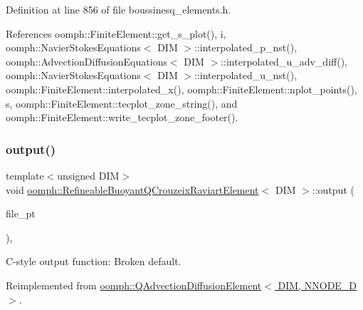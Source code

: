 Definition at line 856 of file boussinesq\+\_\+elements.\+h.



References oomph\+::\+Finite\+Element\+::get\+\_\+s\+\_\+plot(), i, oomph\+::\+Navier\+Stokes\+Equations$<$ D\+I\+M $>$\+::interpolated\+\_\+p\+\_\+nst(), oomph\+::\+Advection\+Diffusion\+Equations$<$ D\+I\+M $>$\+::interpolated\+\_\+u\+\_\+adv\+\_\+diff(), oomph\+::\+Navier\+Stokes\+Equations$<$ D\+I\+M $>$\+::interpolated\+\_\+u\+\_\+nst(), oomph\+::\+Finite\+Element\+::interpolated\+\_\+x(), oomph\+::\+Finite\+Element\+::nplot\+\_\+points(), s, oomph\+::\+Finite\+Element\+::tecplot\+\_\+zone\+\_\+string(), and oomph\+::\+Finite\+Element\+::write\+\_\+tecplot\+\_\+zone\+\_\+footer().

\mbox{\label{classoomph_1_1RefineableBuoyantQCrouzeixRaviartElement_a90579086f991da7fbaf7d92b29abf994}} 
\subsubsection{\texorpdfstring{output()}{output()}\hspace{0.1cm}{\footnotesize\ttfamily [3/4]}}
{\footnotesize\ttfamily template$<$unsigned D\+IM$>$ \\
void \hyperlink{classoomph_1_1RefineableBuoyantQCrouzeixRaviartElement}{oomph\+::\+Refineable\+Buoyant\+Q\+Crouzeix\+Raviart\+Element}$<$ D\+IM $>$\+::output (\begin{DoxyParamCaption}\item[{F\+I\+LE $\ast$}]{file\+\_\+pt }\end{DoxyParamCaption})\hspace{0.3cm}{\ttfamily [inline]}, {\ttfamily [virtual]}}



C-\/style output function\+: Broken default. 



Reimplemented from \hyperlink{classoomph_1_1QAdvectionDiffusionElement_a792f83bb2d8c22365cce60c43853396c}{oomph\+::\+Q\+Advection\+Diffusion\+Element$<$ D\+I\+M, N\+N\+O\+D\+E\+\_\+D $>$}.



